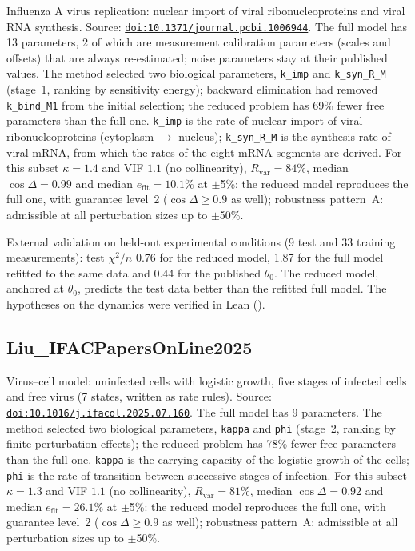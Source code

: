 Influenza A virus replication: nuclear import of viral ribonucleoproteins and viral RNA synthesis. Source: \href{https://doi.org/10.1371/journal.pcbi.1006944}{\nolinkurl{doi:10.1371/journal.pcbi.1006944}}. The full model has 13 parameters, 2 of which are measurement calibration parameters (scales and offsets) that are always re-estimated; noise parameters stay at their published values. The method selected two biological parameters, \texttt{k\_imp} and \texttt{k\_syn\_R\_M} (stage~1, ranking by sensitivity energy); backward elimination had removed \texttt{k\_bind\_M1} from the initial selection; the reduced problem has 69\% fewer free parameters than the full one. \texttt{k\_imp} is the rate of nuclear import of viral ribonucleoproteins (cytoplasm $\to$ nucleus); \texttt{k\_syn\_R\_M} is the synthesis rate of viral mRNA, from which the rates of the eight mRNA segments are derived. For this subset $\kappa=1.4$ and VIF $1.1$ (no collinearity), $R_{\mathrm{var}}=84\%$, median $\cos\Delta=0.99$ and median $e_{\mathrm{fit}}=10.1\%$ at $\pm$5\%: the reduced model reproduces the full one, with guarantee level~2 ($\cos\Delta\ge0.9$ as well); robustness pattern~A: admissible at all perturbation sizes up to $\pm$50\%.

External validation on held-out experimental conditions (9 test and 33 training measurements): test $\chi^2/n$ 0.76 for the reduced model, 1.87 for the full model refitted to the same data and 0.44 for the published $\theta_0$. The reduced model, anchored at $\theta_0$, predicts the test data better than the refitted full model. The hypotheses on the dynamics were verified in Lean ().

\subsection*{Liu\_IFACPapersOnLine2025}

Virus--cell model: uninfected cells with logistic growth, five stages of infected cells and free virus (7 states, written as rate rules). Source: \href{https://doi.org/10.1016/j.ifacol.2025.07.160}{\nolinkurl{doi:10.1016/j.ifacol.2025.07.160}}. The full model has 9 parameters. The method selected two biological parameters, \texttt{kappa} and \texttt{phi} (stage~2, ranking by finite-perturbation effects); the reduced problem has 78\% fewer free parameters than the full one. \texttt{kappa} is the carrying capacity of the logistic growth of the cells; \texttt{phi} is the rate of transition between successive stages of infection. For this subset $\kappa=1.3$ and VIF $1.1$ (no collinearity), $R_{\mathrm{var}}=81\%$, median $\cos\Delta=0.92$ and median $e_{\mathrm{fit}}=26.1\%$ at $\pm$5\%: the reduced model reproduces the full one, with guarantee level~2 ($\cos\Delta\ge0.9$ as well); robustness pattern~A: admissible at all perturbation sizes up to $\pm$50\%.


